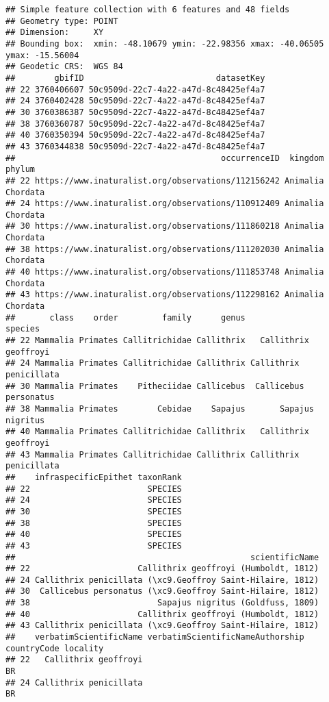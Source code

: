 \documentclass[
]{book}
\begin{document}
\begin{verbatim}
## Simple feature collection with 6 features and 48 fields
## Geometry type: POINT
## Dimension:     XY
## Bounding box:  xmin: -48.10679 ymin: -22.98356 xmax: -40.06505 ymax: -15.56004
## Geodetic CRS:  WGS 84
##        gbifID                           datasetKey
## 22 3760406607 50c9509d-22c7-4a22-a47d-8c48425ef4a7
## 24 3760402428 50c9509d-22c7-4a22-a47d-8c48425ef4a7
## 30 3760386387 50c9509d-22c7-4a22-a47d-8c48425ef4a7
## 38 3760360787 50c9509d-22c7-4a22-a47d-8c48425ef4a7
## 40 3760350394 50c9509d-22c7-4a22-a47d-8c48425ef4a7
## 43 3760344838 50c9509d-22c7-4a22-a47d-8c48425ef4a7
##                                          occurrenceID  kingdom   phylum
## 22 https://www.inaturalist.org/observations/112156242 Animalia Chordata
## 24 https://www.inaturalist.org/observations/110912409 Animalia Chordata
## 30 https://www.inaturalist.org/observations/111860218 Animalia Chordata
## 38 https://www.inaturalist.org/observations/111202030 Animalia Chordata
## 40 https://www.inaturalist.org/observations/111853748 Animalia Chordata
## 43 https://www.inaturalist.org/observations/112298162 Animalia Chordata
##       class    order         family      genus                species
## 22 Mammalia Primates Callitrichidae Callithrix   Callithrix geoffroyi
## 24 Mammalia Primates Callitrichidae Callithrix Callithrix penicillata
## 30 Mammalia Primates    Pitheciidae Callicebus  Callicebus personatus
## 38 Mammalia Primates        Cebidae    Sapajus       Sapajus nigritus
## 40 Mammalia Primates Callitrichidae Callithrix   Callithrix geoffroyi
## 43 Mammalia Primates Callitrichidae Callithrix Callithrix penicillata
##    infraspecificEpithet taxonRank
## 22                        SPECIES
## 24                        SPECIES
## 30                        SPECIES
## 38                        SPECIES
## 40                        SPECIES
## 43                        SPECIES
##                                                scientificName
## 22                      Callithrix geoffroyi (Humboldt, 1812)
## 24 Callithrix penicillata (\xc9.Geoffroy Saint-Hilaire, 1812)
## 30  Callicebus personatus (\xc9.Geoffroy Saint-Hilaire, 1812)
## 38                          Sapajus nigritus (Goldfuss, 1809)
## 40                      Callithrix geoffroyi (Humboldt, 1812)
## 43 Callithrix penicillata (\xc9.Geoffroy Saint-Hilaire, 1812)
##    verbatimScientificName verbatimScientificNameAuthorship countryCode locality
## 22   Callithrix geoffroyi                                           BR         
## 24 Callithrix penicillata                                           BR         

\end{verbatim}
\end{document}
